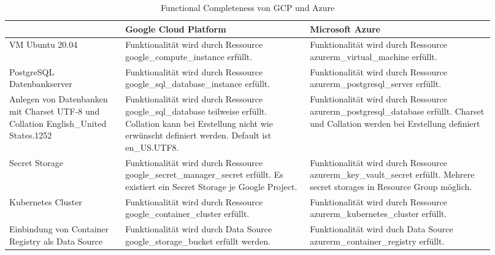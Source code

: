 \begin{spacing}{1.2}
\begin{table}[H]
  \centering
  \begin{tabular}{|p{0.22\linewidth}|p{0.35\linewidth}|p{0.35\linewidth}|}
    \hline
    & Google Cloud Platform & Microsoft Azure\\
    \hline
    VM Ubuntu 20.04 & 
    Funktionalität wird durch Ressource 
    google\_compute\_instance erfüllt. & 
    Funktionalität wird
    durch Ressource  azurerm\_virtual\_machine erfüllt.\\
    \hline
    PostgreSQL Datenbankserver & 
    Funktionalität wird durch Ressource google\_sql\_database\_instance
    erfüllt. &
    Funktionalität wird durch Ressource
    azurerm\_postgresql\_server erfüllt. \\
    \hline
    Anlegen von Datenbanken mit Charset UTF-8 und Collation
    English\_United States.1252 
    & Funktionalität wird durch Ressource google\_sql\_database teilweise
    erfüllt. Collation kann bei Erstellung nicht wie erwünscht
    definiert werden. Default ist en\_US.UTF8. &
    Funktionalität wird durch Ressource 
    azurerm\_postgresql\_database erfüllt. Charset und Collation werden
    bei  Erstellung definiert\\
    \hline
    Secret Storage & Funktionalität wird durch Ressource
    google\_secret\_manager\_secret erfüllt.
    Es existiert ein Secret Storage je Google Project. & 
    Funktionalität wird durch Ressource azurerm\_key\_vault\_secret
    erfüllt. Mehrere secret storages in Resource Group möglich.\\
    \hline
    Kubernetes Cluster &  Funktionalität wird durch Ressource
    google\_container\_cluster erfüllt.
    & Funktionalität wird durch Ressource
    azurerm\_kubernetes\_cluster erfüllt.\\
    \hline
    Einbindung von Container Registry als Data Source & 
    Funktionalität wird durch Data Source 
    google\_storage\_bucket erfüllt werden.
    & Funktionalität wird duch Data Source
    azurerm\_container\_registry erfüllt.\\
    \hline
  \end{tabular}
  \caption{Functional Completeness von GCP und Azure}
\end{table}

\newpage


\end{spacing}
